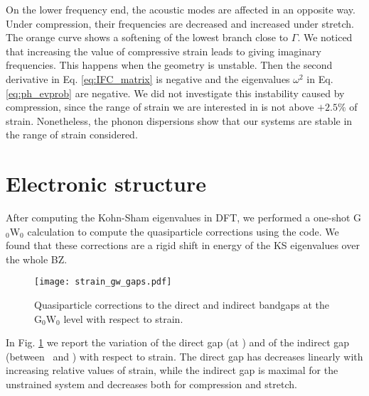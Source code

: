 On the lower frequency end, the acoustic modes are affected in an opposite way. Under compression, their frequencies are decreased and increased under stretch. The orange curve shows a softening of the lowest branch close to $\Gamma$. We noticed that increasing the value of compressive strain leads to giving imaginary frequencies. This happens when the geometry is unstable. Then the second derivative in Eq. \eqref{eq:IFC_matrix} is negative and the eigenvalues $\omega^2$ in Eq. \eqref{eq:ph_evprob} are negative. We did not investigate this instability caused by compression, since the range of strain we are interested in is not above $+2.5\%$ of strain. Nonetheless, the phonon dispersions show that our systems are stable in the range of strain considered.

%
\section{Electronic structure}
After computing the Kohn-Sham eigenvalues in \acrshort{DFT}, we performed a one-shot G$_0$W$_0$ calculation to compute the quasiparticle corrections using the \yambo code. We found that these corrections are a rigid shift in energy of the KS eigenvalues over the whole \acrshort{BZ}. 
\begin{figure}[tbp]
	\vspace{0.5cm}
	\setcapindent{2em}
	\centering
	\texttt{[image: strain\_gw\_gaps.pdf]}
	\caption{Quasiparticle corrections to the direct and indirect bandgaps at the G$_0$W$_0$ level with respect to strain.}
	\label{fig:strain_gw_gaps}
\end{figure}
In Fig. \ref{fig:strain_gw_gaps} we report the variation of the direct gap (at \MM) and of the indirect gap (between \KK~and \MM) with respect to strain. The direct gap has decreases linearly with increasing relative values of strain, while the indirect gap is maximal for the unstrained system and decreases both for compression and stretch.

